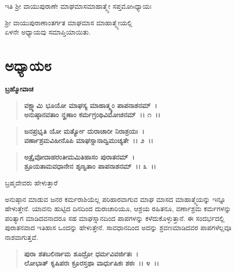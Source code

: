 \begin{center}
ಇತಿ ಶ‍್ರೀ ವಾಯುಪುರಾಣೇ ಮಾಘಮಾಸಮಾಹಾತ್ಮ್ಯೇ ಸಪ್ತಮೋsಧ್ಯಾಯಃ 
\end{center}

\begin{center}
ಶ‍್ರೀ ವಾಯುಪುರಾಣಾಂತರ್ಗತ ಮಾಘಮಾಸ ಮಾಹಾತ್ಮ್ಯೇಯಲ್ಲಿ \\ ಏಳನೇ ಅಧ್ಯಾಯವು ಸಮಾಪ್ತಿಯಾಯಿತು.
\end{center}

\newpage

\section*{ಅಧ್ಯಾಯ೮}

\emptypage

\begin{flushleft}
\textbf{ಬ್ರಹ್ಮೋವಾಚ }
\end{flushleft}

\begin{verse}
\textbf{ವಕ್ಷ್ಯಾಮಿ ಭೂಯೋ ಮಾಘಸ್ಯ ಮಾಹಾತ್ಮ್ಯಂ ಪಾಪನಾಶನಮ್~।}\\\textbf{ಅನುಷ್ಠಾನವತಾಂ ನೄಣಾಂ ಕರ್ಮಗ್ರಂಥಿವಿಮೋಚನಮ್~।। ೧~।। }
\end{verse}

\begin{verse}
\textbf{ಜನಪ್ರಭೃತಿ ಯೋ ಮರ್ತ್ಯೋ ದುರಾಚಾರೀ ನಿರಾಶ್ರಯಃ~।}\\\textbf{ವರ್ಣಾಶ್ರಮವಿಹೀನೊಪಿ ಮಾಘಸ್ನಾನಾದ್ವಿಮುಚ್ಯತೇ~।। ೨~।।}
\end{verse}

\begin{verse}
\textbf{ಅತ್ರೈವೋದಾಹರಂತೀಮಮಿತಿಹಾಸಂ ಪುರಾತನಮ್~।}\\\textbf{ಶ್ರೂಯತಾಮವಧಾನೇನ ಶೃಣ್ವತಾಂ ಪಾಪನಾಶನಮ್~।। ೩~।। }
\end{verse}

\begin{flushleft}
ಬ್ರಹ್ಮದೇವರು ಹೇಳುತ್ತಾರೆ
\end{flushleft}

ಅನುಷ್ಠಾನ ಮಾಡುವ ಜನರ ಕರ್ಮರಾಶಿಯೆಲ್ಲ ಪರಿಹಾರವಾಗುವ ಮಾಘ ಮಾಸದ ಮಾಹಾತ್ಮ್ಯೆಯನ್ನು ಇನ್ನೂ ಹೇಳುತ್ತೇನೆ. ಯಾವನು ಹುಟ್ಟಿದ ದಿನದಿಂದ ದುರಾಚಾರಿಯೂ, ಆಶ್ರಯ ರಹಿತನೂ, ವರ್ಣಾಶ್ರಮ ಕರ್ಮಗಳನ್ನು ಪರಿತ್ಯಾಗ ಮಾಡಿದವನಾದರೂ ಸಹ ಮಾಘಸ್ನಾನದಿಂದ ಪಾಪಗಳನ್ನು ಕಳೆದುಕೊಳ್ಳುತ್ತಾನೆ. ಈ ಸಂದರ್ಭದಲ್ಲಿ ಪುರಾತನವಾದ ಇತಿಹಾಸ ಒಂದನ್ನು ಹೇಳುತ್ತೇನೆ. ಸಾವಧಾನದಿಂದ ಅದನ್ನು ಶ್ರವಣಮಾಡಿದವರ ಪಾಪಗಳೆಲ್ಲವೂ ನಾಶವಾಗುತ್ತವೆ.

\begin{verse}
\textbf{ಪುರಾ ಶತಬಲಿರ್ನಾಮ ಶೂದ್ರೋ ಧರ್ಮವಿವರ್ಜಿತಃ~।}\\\textbf{ಲೋಭಾತ್ ಕೃಷಿಪರಃ ಕ್ರೂರಸ್ತಥಾ ವಾರ್ಧುಷಿಕಃ ಶಠಃ~।। ೪~।। }
\end{verse}

